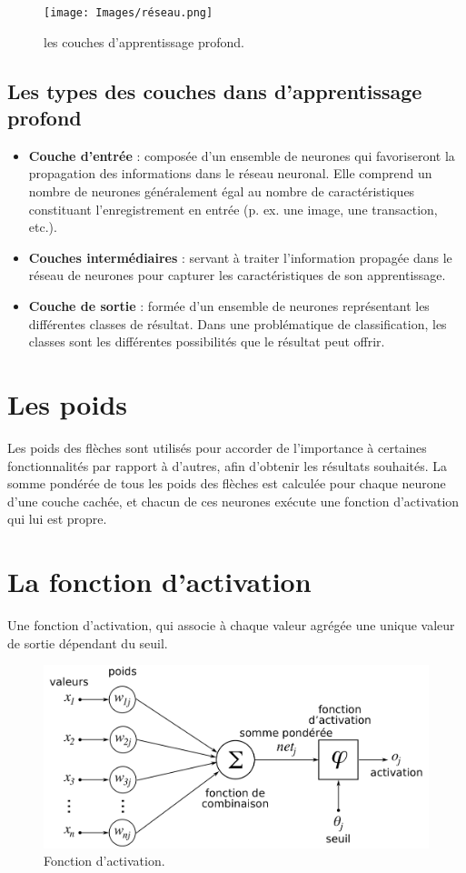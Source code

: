 \begin{figure}[h]
\centering
\texttt{[image: Images/réseau.png]}
\caption{les couches d’apprentissage profond.}
\label{fig:09}
\end{figure}

\subsection{Les types des couches dans d’apprentissage profond}

\begin{itemize}
\item  \textbf{Couche d’entrée} : composée d’un ensemble de neurones qui favoriseront la propagation des informations dans le réseau neuronal. Elle comprend un nombre de neurones généralement égal au nombre de caractéristiques constituant l’enregistrement en entrée (p. ex. une image, une transaction, etc.).
\item \textbf{Couches intermédiaires} : servant à traiter l’information propagée dans le réseau de neurones pour capturer les caractéristiques de son apprentissage.
\item \textbf{Couche de sortie} : formée d’un ensemble de neurones représentant les différentes classes de résultat.
 Dans une problématique de classification, les classes sont les différentes possibilités que le résultat peut offrir.
 
\end{itemize}

 \section{Les poids }
 \label{Les poids}
 Les poids des flèches sont utilisés pour accorder de l'importance à certaines fonctionnalités par rapport à d'autres, afin d'obtenir les résultats souhaités. La somme pondérée de tous les poids des flèches est calculée pour chaque neurone d'une couche cachée, et chacun de ces neurones exécute une fonction d'activation qui lui est propre.

 \section{La fonction d'activation }
 Une fonction d’activation, qui associe à chaque valeur agrégée une unique valeur de sortie dépendant du seuil.
 
 \begin{figure}[h]
\centering
\includegraphics[scale=0.3]{Images/1-neurone-formel.png}
\caption{Fonction d’activation.}
\label{fig:10}
\end{figure}

